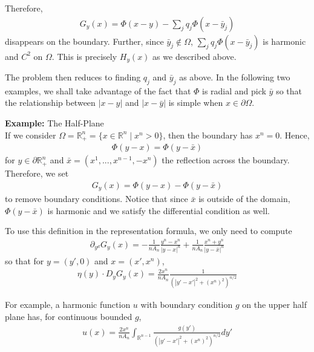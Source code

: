 \documentclass{article}
\newcommand{\R}{{\mathbb{R}}}
\newcommand{\pd}{\partial}
\begin{document}
	Therefore, 
	\begin{align*}
		G_{y}(x) = \Phi(x-y) - \sum_{j} q_{j} \Phi(x-\bar{y}_{j})
	\end{align*}
	disappears on the boundary. Further, since $\bar{y}_{j} \notin \Omega$,  $\sum_{j} q_{j} \Phi(x-\bar{y}_{j})$ is harmonic and $C^{2}$ on $\Omega$. This is precisely $H_{y}(x)$ as we described above. 
	
	The problem then reduces to finding $q_{j}$ and $\bar{y}_{j}$ as above. In the following two examples, we shall take advantage of the fact that $\Phi$ is radial and pick $\bar{y}$ so that the relationship between $|x-y|$ and $|x-\bar{y}|$ is simple when $x \in \pd \Omega$. 
	
	\vspace{1 cm}
	\textbf{Example:} The Half-Plane \\
	
	If we consider $\Omega = \R^{n}_{+} = \{x \in \R^{n} \mid x^{n} > 0\}$, then the boundary has $x^{n} = 0$. Hence, 
	\begin{align*}
		\Phi(y-x) = \Phi(y - \bar{x})
	\end{align*}
	for $y \in \pd \R^{n}_{+}$ and $\bar{x} = (x^1,...,x^{n-1},-x^{n})$ the reflection across the boundary. Therefore, we set
	\begin{align*}
		G_{y}(x) = \Phi(y-x) - \Phi(y-\bar{x})
	\end{align*}
	to remove boundary conditions. Notice that since $\bar{x}$ is outside of the domain, $\Phi(y-\bar{x})$ is harmonic and we satisfy the differential condition as well. 
	
	To use this definition in the representation formula, we only need to compute 
	\begin{align*}
		\pd_{y^{d}}G_{y}(x) = -\frac{1}{n A_{n}} \frac{y^{n}-x^{n}}{|y-x|^{n}}  + \frac{1}{n A_{n}} \frac{x^{n}+y^{n}}{|y - \bar{x}|^{n}}
	\end{align*}
	so that for $y = (y',0)$ and $x = (x',x^n)$,
	\begin{align*}
		\eta(y) \cdot D_{y}G_{y}(x) = \frac{2x^{n}}{nA_{n}} \frac{1}{(|y'-x'|^{2} + (x^{n})^{2})^{n/2}}
	\end{align*}
	
	For example, a harmonic function $u$  with boundary condition $g$ on the upper half plane has, for continuous bounded $g$, 
	\begin{align*}
		u(x) = \frac{2x^{n}}{n A_{n}} \int_{\R^{n-1}} \frac{g(y')}{(|y'-x'|^{2} + (x^{n})^{2})^{n/2}} dy'
	\end{align*}
	
\end{document}
